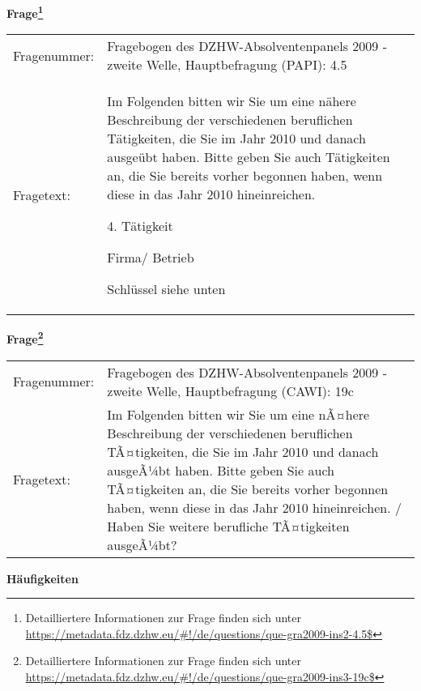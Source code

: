 				\vspace*{0.5cm}
                \noindent\textbf{Frage\footnote{Detailliertere Informationen zur Frage finden sich unter
		              \url{https://metadata.fdz.dzhw.eu/\#!/de/questions/que-gra2009-ins2-4.5$}}}\\
				\begin{tabularx}{\hsize}{@{}lX}
					Fragenummer: &
					  Fragebogen des DZHW-Absolventenpanels 2009 - zweite Welle, Hauptbefragung (PAPI):
					  4.5
 \\
					Fragetext: & Im Folgenden bitten wir Sie um eine nähere Beschreibung der verschiedenen beruflichen Tätigkeiten, die Sie im Jahr 2010 und danach ausgeübt haben. Bitte geben Sie auch Tätigkeiten an, die Sie bereits vorher begonnen haben, wenn diese in das Jahr 2010 hineinreichen.\par  4. Tätigkeit\par  Firma/ Betrieb\par  Schlüssel siehe unten \\
				\end{tabularx}
				\vspace*{0.5cm}
                \noindent\textbf{Frage\footnote{Detailliertere Informationen zur Frage finden sich unter
		              \url{https://metadata.fdz.dzhw.eu/\#!/de/questions/que-gra2009-ins3-19c$}}}\\
				\begin{tabularx}{\hsize}{@{}lX}
					Fragenummer: &
					  Fragebogen des DZHW-Absolventenpanels 2009 - zweite Welle, Hauptbefragung (CAWI):
					  19c
 \\
					Fragetext: & Im Folgenden bitten wir Sie um eine nÃ¤here Beschreibung der verschiedenen beruflichen TÃ¤tigkeiten, die Sie im Jahr 2010 und danach ausgeÃ¼bt haben. Bitte geben Sie auch TÃ¤tigkeiten an, die Sie bereits vorher begonnen haben, wenn diese in das Jahr 2010 hineinreichen. / Haben Sie weitere berufliche TÃ¤tigkeiten ausgeÃ¼bt? \\
				\end{tabularx}





        		\vspace*{0.5cm}
                \noindent\textbf{Häufigkeiten}

